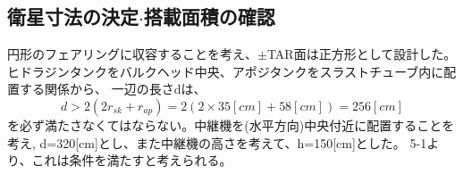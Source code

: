 \subsection{衛星寸法の決定$\cdot$搭載面積の確認}
円形のフェアリングに収容することを考え、$\pm$TAR面は正方形として設計した。
ヒドラジンタンクをバルクヘッド中央、アポジタンクをスラストチューブ内に配置する関係から、
一辺の長さdは、
\begin{equation}
  d > 2(2r_{sk} + r_{ap}) = 2(2 \times 35[cm] + 58[cm]) = 256[cm]
\end{equation}
を必ず満たさなくてはならない。中継機を(水平方向)中央付近に配置することを考え,
d=320[cm]とし、また中継機の高さを考えて、h=150[cm]とした。
5-1より、これは条件を満たすと考えられる。
